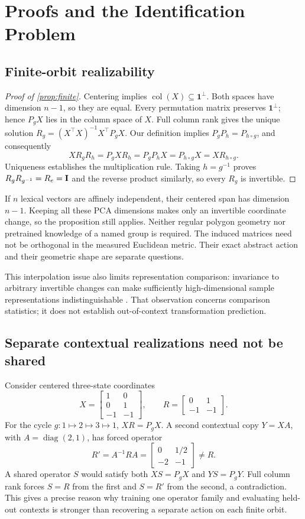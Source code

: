 \section{Proofs and the Identification Problem}
\label{app:theory}
\label{sec:appendix}
\subsection{Finite-orbit realizability}
\begin{proof}[Proof of \cref{prop:finite}]
Centering implies $\operatorname{col}(X)\subseteq\mathbf{1}^{\perp}$. Both spaces have dimension $n-1$, so they are equal. Every permutation matrix preserves $\mathbf{1}^{\perp}$; hence $P_gX$ lies in the column space of $X$. Full column rank gives the unique solution $R_g=(X^\top X)^{-1}X^\top P_gX$. Our definition implies $P_gP_h=P_{h\circ g}$, and consequently
\[
 XR_gR_h=P_gXR_h=P_gP_hX=P_{h\circ g}X=XR_{h\circ g}.
\]
Uniqueness establishes the multiplication rule. Taking $h=g^{-1}$ proves $R_gR_{g^{-1}}=R_e=\mathbf{I}$ and the reverse product similarly, so every $R_g$ is invertible.
\end{proof}
If $n$ lexical vectors are affinely independent, their centered span has dimension $n-1$. Keeping all these PCA dimensions makes only an invertible coordinate change, so the proposition still applies. Neither regular polygon geometry nor pretrained knowledge of a named group is required. The induced matrices need not be orthogonal in the measured Euclidean metric. Their exact abstract action and their geometric shape are separate questions.

This interpolation issue also limits representation comparison: invariance to arbitrary invertible changes can make sufficiently high-dimensional sample representations indistinguishable \citep{kornblith2019similarity}. That observation concerns comparison statistics; it does not establish out-of-context transformation prediction.

\subsection{Separate contextual realizations need not be shared}
Consider centered three-state coordinates
\[
 X=\begin{bmatrix}1&0\\0&1\\-1&-1\end{bmatrix},\qquad
 R=\begin{bmatrix}0&1\\-1&-1\end{bmatrix}.
\]
For the cycle $g:1\mapsto2\mapsto3\mapsto1$, $XR=P_gX$. A second contextual copy $Y=XA$, with $A=\operatorname{diag}(2,1)$, has forced operator
\[
 R'=A^{-1}RA=\begin{bmatrix}0&1/2\\-2&-1\end{bmatrix}\ne R.
\]
A shared operator $S$ would satisfy both $XS=P_gX$ and $YS=P_gY$. Full column rank forces $S=R$ from the first and $S=R'$ from the second, a contradiction. This gives a precise reason why training one operator family and evaluating held-out contexts is stronger than recovering a separate action on each finite orbit.

